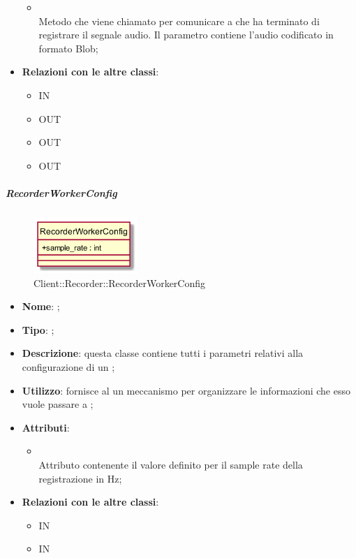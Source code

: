 \begin{itemize}
\begin{itemize}
		\item[]  \\		Metodo che viene chiamato per comunicare a  che ha terminato di registrare il segnale audio. Il parametro contiene l'audio codificato in formato Blob;\\
	\end{itemize}
	\item \textbf{Relazioni con le altre classi}:
	\begin{itemize}
		\item IN \hyperlink{Recorder_label}{}
		\item OUT \hyperlink{RecorderWorkerConfig_label}{}
		\item OUT \hyperlink{RecorderWorkerMsg_label}{}
		\item OUT \hyperlink{RecorderMsg_label}{}
	\end{itemize}
\end{itemize}
\FloatBarrier

\hypertarget{RecorderWorkerConfig_label}{\subparagraph{RecorderWorkerConfig}}
\begin{figure}[h]
	\centering
	\includegraphics[width=0.35\textwidth,height=\textheight,keepaspectratio]{images/ClassRecorderWorkerConfig.png}
	\caption{Client::Recorder::RecorderWorkerConfig}
\end{figure}
\begin{itemize}
	\item \textbf{Nome}: ;
	\item \textbf{Tipo}: ;
	\item \textbf{Descrizione}: questa classe contiene tutti i parametri relativi alla configurazione di un ;
	\item \textbf{Utilizzo}: fornisce al  un meccanismo per organizzare le informazioni che esso vuole passare a ;
	\item \textbf{Attributi}:
	\begin{itemize}
		\item[]  \\
		Attributo contenente il valore definito per il sample rate della registrazione in Hz;
	\end{itemize}
	\item \textbf{Relazioni con le altre classi}:
	\begin{itemize}
		\item IN \hyperlink{RecorderWorker_label}{}
		\item IN \hyperlink{RecorderMsg_label}{}
	\end{itemize}
\end{itemize}
\FloatBarrier

